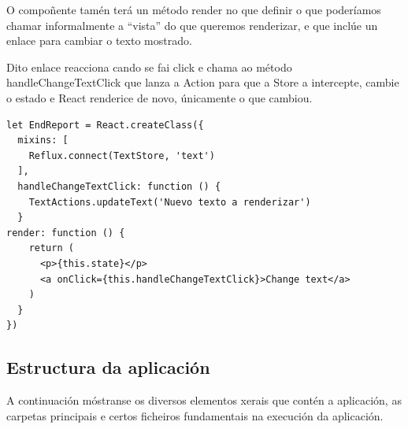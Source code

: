    O compoñente tamén terá un método render no que definir o que poderíamos 
chamar informalmente a ``vista'' do que queremos renderizar, e que inclúe un 
enlace para cambiar o texto mostrado.

    Dito enlace reacciona cando se fai click e chama ao método 
handleChangeTextClick que lanza a Action para que a Store a intercepte, cambie 
o estado e React renderice de novo, únicamente o que cambiou.

    \lstset{}
     \begin{lstlisting}[caption=Exemplo de compoñente de React., 
label=fig:design:component]
let EndReport = React.createClass({
  mixins: [
    Reflux.connect(TextStore, 'text')
  ],
  handleChangeTextClick: function () {
    TextActions.updateText('Nuevo texto a renderizar')
  }
render: function () {
    return (
      <p>{this.state}</p>
      <a onClick={this.handleChangeTextClick}>Change text</a>
    )
  }
})
    \end{lstlisting}


    \subsection{Estructura da aplicación}

    A continuación móstranse os diversos elementos xerais que contén a 
aplicación, as carpetas principais e certos ficheiros fundamentais na execución 
da aplicación.

